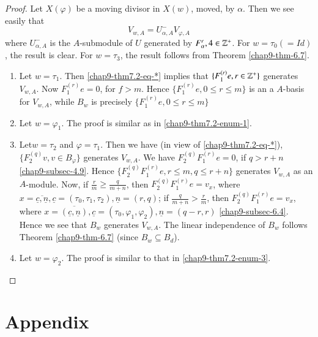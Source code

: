 \begin{proof}
Let $X(\varphi)$ be a moving divisor in $X(w)$, moved, by $\alpha$. Then we see easily that
\begin{equation*}\label{chap9-thm7.2-eq-*}
V_{w, A} = U_{\alpha, A}^{-}V_{\varphi, A}\tag{$\ast$}
\end{equation*}
where $U_{\alpha, A}^{-}$ is the $A$-submodule of $U$ generated by $ F_{\alpha}^{r}, 4 \in \mathbb{Z}^{+}$. For $w = \tau_{0}(=Id)$, the result is clear. For $w = \tau_{3}$, the result follows from
Theorem \ref{chap9-thm-6.7}.
\begin{enumerate}[(1)]
\item Let $w= \tau_{1}$. Then \eqref{chap9-thm7.2-eq-*} implies that $ \{ F_{1}^{(r)}e,r \in \mathbb{Z}^{+}\}$ generates $V_{w,A}$. Now $F_{1}^{(r)}e = 0$, for $f > m$. Hence $\{F_{1}^{(r)}e, 0 \leq r \leq m \}$ is an a $A$-basis for $V_{w, A}$, while $B_{w}$ is precisely $\{ F_{1}^{(r)} e, 0 \leq r \leq m \}$\label{chap9-thm7.2-enum-1}

\item Let $w= \varphi_{1}$. The proof is similar as in \eqref{chap9-thm7.2-enum-1}.\label{chap9-thm7.2-enum-2}

\item Let\pageoriginale $w =\tau_{2}$ and $\varphi= \tau_{1}$. Then  we have (in view of \eqref{chap9-thm7.2-eq-*}), $\{F_{2}^{(q)}v,v \in B_{\varphi}\}$ generates $V_{w, A}$. We  have $F_{2}^{(q)}F_{1}^{(r)}e = 0$, if $q> r + n$ \eqref{chap9-subsec-4.9}. Hence $\{F_{2}^{(q)}F_{1}^{(r)} e, r \leq m, q \leq r + n\}$ generates $V_{w, A}$ as an $A$-module. Now, if $\frac{r}{m} \geq \frac{q}{m+n}$, then $F_{2}^{(q)}F_{1}^{(r)} e = v_{x}$, where $x = \overline{\underline{c}, \underline{n}}, \underline{c} = (\tau_{0},\tau_{1}, \tau_{2}), \underline{n} = (r, q)$; if $\frac{q}{m+n} > \frac{r}{m}$, then $F_{2}^{(q)}F_{1}^{(r)}e=v_{x}$, where $x = \overline{(\underline{c}, \underline{n})}, \underline{c} = (\tau_{0}, \varphi_{1}, \varphi_{2}), \underline{n} = (q-r,r)$ \eqref{chap9-subsec-6.4}. Hence we see that $B_{w}$ generates $V_{w,A}$. The linear independence of $B_{w}$ follows Theorem \ref{chap9-thm-6.7} (since $B_{w}\subseteq B_{d}$).\label{chap9-thm7.2-enum-3}

\item Let $w=\varphi_{2}$. The proof is similar to that in \eqref{chap9-thm7.2-enum-3}.
\end{enumerate}
\end{proof}

\section{Appendix}\label{chap9-sec-8}

